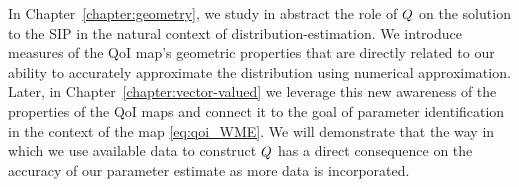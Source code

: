In Chapter~\ref{chapter:geometry}, we study in abstract the role of $Q$ on the solution to the SIP in the natural context of distribution-estimation.
We introduce measures of the QoI map's geometric properties that are directly related to our ability to accurately approximate the distribution using numerical approximation.
Later, in Chapter~\ref{chapter:vector-valued} we leverage this new awareness of the properties of the QoI maps and connect it to the goal of parameter identification in the context of the map \eqref{eq:qoi_WME}.
We will demonstrate that the way in which we use available data to construct $Q$ has a direct consequence on the accuracy of our parameter estimate as more data is incorporated.
